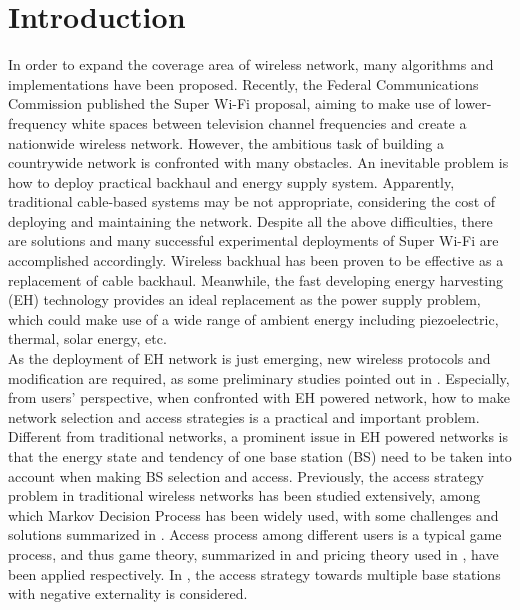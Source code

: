 \documentclass[conference]{IEEEtran}
\begin{document}
\section{Introduction}
In order to expand the coverage area of wireless network,
many algorithms and implementations have been proposed.
Recently, the Federal Communications Commission published the Super Wi-Fi proposal,
aiming to make use of lower-frequency white spaces between television channel frequencies
and create a nationwide wireless network.
However, the ambitious task of building a countrywide network is confronted with many obstacles.
An inevitable problem is how to deploy practical backhaul and energy supply system.
Apparently, traditional cable-based systems may be not appropriate, considering the cost of deploying and maintaining the network.
Despite all the above difficulties, there are solutions and
many successful experimental deployments of Super Wi-Fi are accomplished accordingly.
Wireless backhual has been proven to be effective \cite{30} as a replacement of cable backhaul.
Meanwhile, the fast developing energy harvesting (EH) technology provides an ideal replacement as the power supply problem,
which could make use of a wide range of ambient energy including piezoelectric, thermal, solar energy, etc.\\
\indent As the deployment of EH network is just emerging,
new wireless protocols and modification are required, as some preliminary studies pointed out in \cite{27}. Especially, from users' perspective, when confronted with EH powered network, how to make network selection and access strategies is a practical and important problem. Different from traditional networks, a prominent issue in EH powered networks is that the energy state and tendency of one base station (BS) need to be taken into account when making BS selection and access.
Previously, the access strategy problem in traditional wireless networks has been studied extensively, among which
Markov Decision Process has been widely used,
with some challenges and solutions summarized in \cite{23}.
Access process among different users is a typical game process,
and thus game theory, summarized in \cite{22}
and pricing theory used in \cite{7}, have been applied respectively.
In \cite{5}, the access strategy towards multiple base stations with negative externality is considered.
\end{document}
